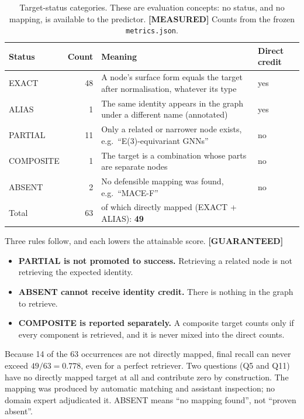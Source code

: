 \documentclass[11pt,a4paper]{article}
\theoremstyle{remark}
\newcommand{\code}[1]{\texttt{\small #1}}
\newcommand{\vtag}[2]{{\sffamily\scriptsize\bfseries\textcolor{#1}{[#2]}}}
\newcommand{\Gtag}{\vtag{accent}{GUARANTEED}}
\newcommand{\Mtag}{\vtag{measgreen}{MEASURED}}
\begin{document}
\begin{table}[!htbp]
\centering
\caption[Target-status categories]{Target-status categories. These are evaluation concepts: no status, and no
mapping, is available to the predictor. \Mtag{} Counts from the frozen \code{metrics.json}.}
\label{tab:status}
\small
\begin{tabularx}{\linewidth}{lrXl}
\toprule
Status & Count & Meaning & Direct credit\\
\midrule
EXACT & 48 & A node's surface form equals the target after normalisation, whatever its type & yes\\
ALIAS & 1 & The same identity appears in the graph under a different name (annotated) & yes\\
PARTIAL & 11 & Only a related or narrower node exists, e.g.\ ``E(3)-equivariant GNNs'' & no\\
COMPOSITE & 1 & The target is a combination whose parts are separate nodes & no\\
ABSENT & 2 & No defensible mapping was found, e.g.\ ``MACE-F'' & no\\
\midrule
Total & 63 & of which directly mapped (EXACT + ALIAS): \textbf{49} & \\
\bottomrule
\end{tabularx}
\end{table}

Three rules follow, and each lowers the attainable score. \Gtag
\begin{itemize}
  \item \textbf{PARTIAL is not promoted to success.} Retrieving a related node is not
        retrieving the expected identity.
  \item \textbf{ABSENT cannot receive identity credit.} There is nothing in the graph to
        retrieve.
  \item \textbf{COMPOSITE is reported separately.} A composite target counts only if every
        component is retrieved, and it is never mixed into the direct counts.
\end{itemize}

\begin{cautionbox}
Because 14 of the 63 occurrences are not directly mapped, final recall can never exceed
$49/63=0.778$, even for a perfect retriever. Two questions (Q5 and Q11) have no directly
mapped target at all and contribute zero by construction. The mapping was produced by
automatic matching and assistant inspection; no domain expert adjudicated it. ABSENT
means ``no mapping found'', not ``proven absent''.
\end{cautionbox}
\end{document}
